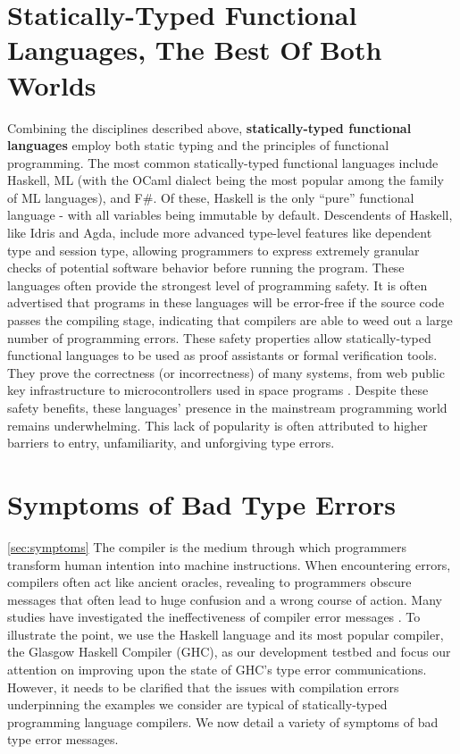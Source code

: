 \section{Statically-Typed Functional Languages, The Best Of Both Worlds}
Combining the disciplines described above, \textbf{statically-typed functional languages} employ both static typing and the principles of functional programming. The most common statically-typed functional languages include Haskell,  ML (with the OCaml dialect being the most popular among the family of ML languages), and F\#. 
Of these, Haskell is the only ``pure'' functional language - with all variables being immutable by default.
Descendents of Haskell, like Idris and Agda, include more advanced type-level features like dependent type and session type, allowing programmers to express extremely granular checks of potential software behavior before running the program. These languages often provide the strongest level of programming safety. It is often advertised that programs in these languages will be error-free if the source code passes the compiling stage, indicating that compilers are able to weed out a large number of programming errors. These safety properties allow statically-typed functional languages to be used as proof assistants or formal verification tools. They prove the correctness (or incorrectness) of many systems, from web public key infrastructure \cite{Bhargavan2021-no} to microcontrollers used in space programs \cite{Mokhov2019-zj}. Despite these safety benefits, these languages' presence in the mainstream programming world remains underwhelming. This lack of popularity is often attributed to higher barriers to entry, unfamiliarity, and unforgiving type errors.

\section{Symptoms of Bad Type Errors}
\ref{sec:symptoms}
 The compiler is the medium through which programmers transform human intention into machine instructions. When encountering errors, compilers often act like ancient oracles, revealing to programmers obscure messages that often lead to huge confusion and a wrong course of action. Many studies have investigated the ineffectiveness of compiler error messages \cite{Barik2017-gy, Becker2019-cs, Becker2016-kc}.  To illustrate the point, we use the Haskell language and its most popular compiler, the Glasgow Haskell Compiler (GHC), as our development testbed and focus our attention on improving upon the state of GHC's type error communications. However, it needs to be clarified that the issues with compilation errors underpinning the examples we consider are typical of statically-typed programming language compilers. We now detail a variety of symptoms of bad type error messages.



